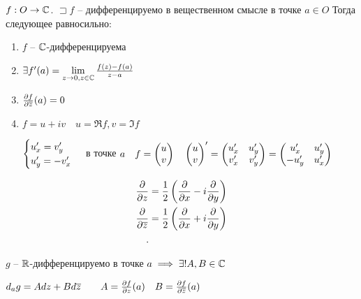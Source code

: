  \begin{theorem}

    $f:O \to \mathbb{C}$. $\sqsupset f$ -- дифференцируемо в вещественном смысле в точке $a\in O$
    Тогда следующее равносильно:
     \begin{enumerate}
        \item $f$ --  $\mathbb{C}$-дифференцируема
        \item $\exists \p f(a) = \lim_{z \to 0, z\in \C} \frac{f(z) - f(a)}{z-a}$
        \item $\frac{\partial f}{\partial \overline{z}}(a) = 0$
        \item $f = u+iv\quad u = \Re f, v = \Im f$

             $\begin{cases}
                 u^{\prime}_x = v^{\prime}_y\\
                 u^{\prime}_y = -v^{\prime}_x
                 \end{cases}$ в точке $a\quad f = \begin{pmatrix} u\\v \end{pmatrix} \quad \begin{pmatrix} u\\v \end{pmatrix} ^{\prime} = \begin{pmatrix} u^{\prime}_x &u^{\prime}_y\\ v^{\prime}_x & v^{\prime}_y \end{pmatrix} = \begin{pmatrix} u^{\prime}_x & u^{\prime}_y \\ -u^{\prime}_y & u^{\prime}_x \end{pmatrix}  $
    \end{enumerate}
\end{theorem}

\begin{note}
    \begin{align*}
        \frac{\partial }{\partial z} &= \frac{1}{2}\left( \frac{\partial}{\partial x} - i \frac{\partial }{\partial y} \right)  \\
        \frac{\partial }{\partial \overline{z}} &= \frac{1}{2}\left( \frac{\partial}{\partial x} + i \frac{\partial }{\partial y} \right)  \\
    .\end{align*}
\end{note}
\begin{note}
    $g$ --  $\mathbb{R}$-дифференцируемо в точке $a \implies \exists !A,B\in \mathbb{C}$

    $d_ag = Adz + Bd\overline{z}\qquad A = \frac{\partial f}{\partial z}(a)\quad B = \frac{\partial f}{\partial \overline{z}}(a)$
\end{note}

